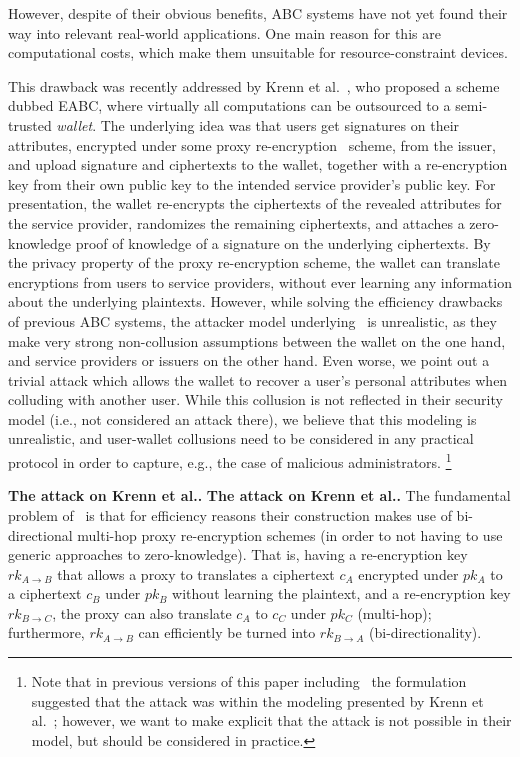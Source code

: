 \documentclass[runningheads]{llncs}
\begin{document}
However, despite of their obvious benefits, ABC systems have not yet found their way into relevant real-world applications.
One main reason for this are computational costs, which make them unsuitable for resource-constraint devices.

This drawback was recently addressed by Krenn et al.~\cite{towardsEABC}, who proposed a scheme dubbed EABC, where virtually all computations can be outsourced to a semi-trusted \emph{wallet}.
The underlying idea was that users get signatures on their attributes, encrypted under some proxy re-encryption~\cite{BBS} scheme, from the issuer, and upload signature and ciphertexts to the wallet, together with a re-encryption key from their own public key to the intended service provider's public key.
For presentation, the wallet re-encrypts the ciphertexts of the revealed attributes for the service provider, randomizes the remaining ciphertexts, and attaches a zero-knowledge proof of knowledge of a signature on the underlying ciphertexts.
By the privacy property of the proxy re-encryption scheme, the wallet can translate encryptions from users to service providers, without ever learning any information about the underlying plaintexts.
However, while solving the efficiency drawbacks of previous ABC systems, the attacker model underlying~\cite{towardsEABC} is unrealistic, as they make very strong non-collusion assumptions between the wallet on the one hand, and service providers or issuers on the other hand.
Even worse, we point out a trivial attack which allows the wallet to recover a user's personal attributes when colluding with another user.
While this collusion is not reflected in their security model (i.e., not considered an attack there), we believe that this modeling is unrealistic, and user-wallet collusions need to be considered in any practical protocol in order to capture, e.g., the case of malicious administrators.%
\footnote{Note that in previous versions of this paper including~\cite{DBLP:conf/cans/HabockK19} the formulation suggested that the attack was within the modeling presented by Krenn et al.~\cite{towardsEABC}; however, we want to make explicit that the attack is not possible in their model, but should be considered in practice.}

\ifCANS
\textbf{The attack on Krenn et al.\cite{towardsEABC}.}
\else
\medskip\textbf{The attack on Krenn et al.\cite{towardsEABC}.}
\fi
The fundamental problem of~\cite{towardsEABC} is that for efficiency reasons their construction makes use of bi-directional multi-hop proxy re-encryption schemes (in order to not having to use generic approaches to zero-knowledge).
That is, having a re-encryption key $rk_{A\to B}$ that allows a proxy to translates a ciphertext $c_A$ encrypted under $pk_A$ to a ciphertext $c_B$ under $pk_B$ without learning the plaintext, and a re-encryption key $rk_{B\to C}$, the proxy can also translate $c_A$ to $c_C$ under $pk_C$ (multi-hop);
furthermore, $rk_{A\to B}$ can efficiently be turned into $rk_{B\to A}$ (bi-directionality).
\end{document}
